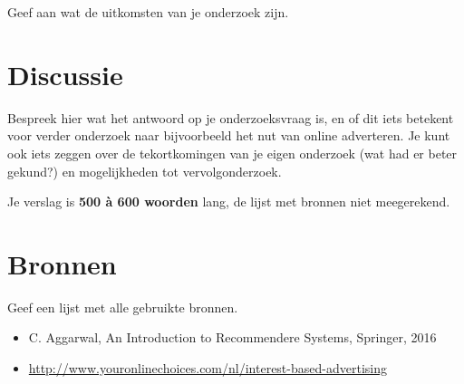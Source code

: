\documentclass[11pt]{article}
\begin{document}
Geef aan wat de uitkomsten van je onderzoek zijn.

\section*{Discussie}

Bespreek hier wat het antwoord op je onderzoeksvraag is, en of dit iets betekent voor verder onderzoek naar bijvoorbeeld het nut van online adverteren. Je kunt ook iets zeggen over de tekortkomingen van je eigen onderzoek (wat had er beter gekund?) en mogelijkheden tot vervolgonderzoek. 

Je verslag is  \textbf{500 \`a 600 woorden} lang,  de lijst met bronnen niet meegerekend. 

\newpage
\section*{Bronnen}

Geef een lijst met alle gebruikte bronnen.

\begin{itemize}
\item C. Aggarwal, An Introduction to Recommendere Systems, Springer, 2016
\item \url{http://www.youronlinechoices.com/nl/interest-based-advertising}
\end{itemize}
\end{document}
